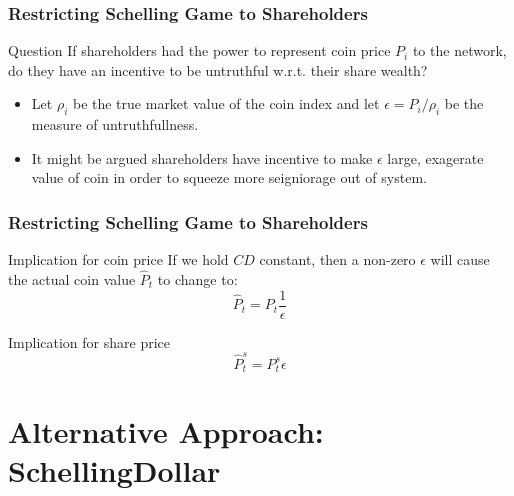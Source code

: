 \documentclass{beamer}
\begin{document}
    
\begin{frame}
  \frametitle{Restricting Schelling Game to Shareholders}

  \begin{block}{Question}
    If shareholders had the power to represent coin price $P_{i}$ to
    the network, do they have an incentive to be untruthful
    w.r.t. their share wealth?
  \end{block}
  
  \begin{itemize}
  \item Let $\rho_{i}$ be the true market value of the coin index and let
    $\epsilon = P_{i}/\rho_{i}$ be the measure of untruthfullness.
  \item It might be argued shareholders have incentive to make
    $\epsilon$ large, exagerate value of coin in order to squeeze more
    seigniorage out of system.
  \end{itemize}

\end{frame}

\begin{frame}
  \frametitle{Restricting Schelling Game to Shareholders}

  \begin{block}{Implication for coin price}
    If we hold $CD$ constant, then a non-zero $\epsilon$ will cause
    the actual coin value $\hat{P}_{t}$ to change to:
    \begin{equation}
      \hat{P}_{t} = P_{t}\frac{1}{\epsilon}
    \end{equation}
  \end{block}

  \begin{block}{Implication for share price}
    \begin{equation}
      \hat{P}^{s}_{t} = P^{s}_{t}\epsilon
    \end{equation}
  \end{block}
\end{frame}

\section{Alternative Approach: SchellingDollar}
\end{document}
